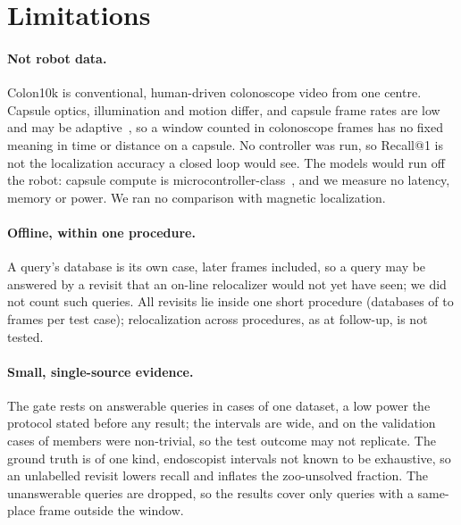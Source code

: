 \section{Limitations}
\label{sec:limitations}

\paragraph{Not robot data.} Colon10k is conventional, human-driven
colonoscope video from one centre. Capsule optics, illumination and motion
differ, and capsule frame rates are low and may be
adaptive~\cite{cao2024robotic,bause2026capsulemotion}, so a window counted in
colonoscope frames has no fixed meaning in time or distance on a capsule. No
controller was run, so Recall@1 is not the localization accuracy a closed
loop would see. The models would run off the robot: capsule compute is
microcontroller-class~\cite{bause2026capsulemotion}, and we measure no
latency, memory or power. We ran no comparison with magnetic localization.

\paragraph{Offline, within one procedure.} A query's database is its own
case, later frames included, so a query may be answered by a revisit that an
on-line relocalizer would not yet have seen; we did not count such queries.
All revisits lie inside one short procedure (databases of 
to  frames per test case); relocalization across procedures,
as at follow-up, is not tested.

\paragraph{Small, single-source evidence.} The gate rests on 
answerable queries in  cases of one dataset, a low power the protocol stated before any result; the intervals
are wide, and on the  validation cases  of
 members were non-trivial, so the test outcome may not
replicate. The ground truth is of
one kind, endoscopist intervals not known to be exhaustive, so an unlabelled
revisit lowers recall and inflates the zoo-unsolved fraction. The  unanswerable
queries are dropped, so the results cover only queries with a same-place
frame outside the window.

